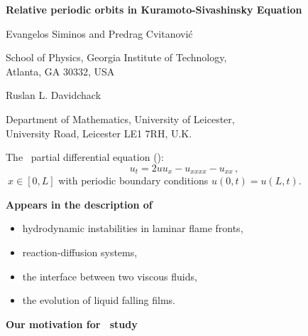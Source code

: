 \documentclass{article}
\begin{document}
{\normalsize \bf \color{NavyBlue} Relative periodic orbits in Kuramoto-Sivashinsky Equation}
\newpage

{\Large \color{green} Evangelos Siminos and Predrag Cvitanovi\'c}
\newpage

\begin{minipage}[t]{7in}
	\begin{center}
		{\normalsize School of Physics, Georgia Institute of Technology,\\
		Atlanta, GA 30332, USA }
	\end{center}
\end{minipage}

\newpage

{\Large \color{green} Ruslan L. Davidchack}
\newpage

\begin{minipage}[t]{7in}
	\begin{center}
		{\normalsize Department of Mathematics, University of Leicester,\\
		University Road, Leicester LE1 7RH, U.K. }
	\end{center}
\end{minipage}

\newpage

\Large
\begin{minipage}[t]{7in}
\begin{center}
The \KS\ partial differential equation (\kse):
\[
	u_t=2uu_x-u_{xxxx}-u_{xx} \,,
	\label{eq:KSe}
\]
$\ x\in[0,L]$ with periodic boundary conditions $u(0,t)=u(L,t)$.
\end{center}
\end{minipage}

\newpage

 {\color{NavyBlue}\LARGE\bf Appears in the description of}

\newpage

\begin{minipage}[t]{7in}
\begin{itemize}
	\item hydrodynamic instabilities in laminar flame fronts,
	\item reaction-diffusion systems,
	\item the interface between two viscous fluids,
	\item the evolution of liquid falling films.
\end{itemize}
\end{minipage}

\newpage
{\color{NavyBlue}\LARGE\bf Our motivation for \kse\ study}
\end{document}
